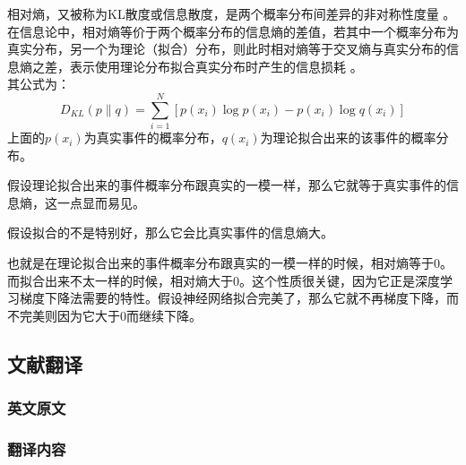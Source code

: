 \documentclass[a4paper,twoside]{article}
\theoremstyle{definition} \newtheorem{law}[thm]{Law}
\theoremstyle{plain} \newtheorem{jury}[thm]{Jury}
\theoremstyle{remark} \newtheorem*{marg}{Margaret}
\begin{document}
相对熵，又被称为KL散度或信息散度，是两个概率分布间差异的非对称性度量 。在信息论中，相对熵等价于两个概率分布的信息熵的差值，若其中一个概率分布为真实分布，另一个为理论（拟合）分布，则此时相对熵等于交叉熵与真实分布的信息熵之差，表示使用理论分布拟合真实分布时产生的信息损耗 。\\
其公式为：
$$
D_{K L}(p \| q)=\sum_{i=1}^{N}\left[p\left(x_{i}\right) \log p\left(x_{i}\right)-p\left(x_{i}\right) \log q\left(x_{i}\right)\right]
$$
上面的$p(x_i)$为真实事件的概率分布，$q(x_i )$为理论拟合出来的该事件的概率分布。

假设理论拟合出来的事件概率分布跟真实的一模一样，那么它就等于真实事件的信息熵，这一点显而易见。

假设拟合的不是特别好，那么它会比真实事件的信息熵大。

也就是在理论拟合出来的事件概率分布跟真实的一模一样的时候，相对熵等于0。而拟合出来不太一样的时候，相对熵大于0。这个性质很关键，因为它正是深度学习梯度下降法需要的特性。假设神经网络拟合完美了，那么它就不再梯度下降，而不完美则因为它大于0而继续下降。

\clearpage
\subsection*{文献翻译}
\subsubsection*{英文原文}


\clearpage
\subsubsection*{翻译内容}
\end{document}
